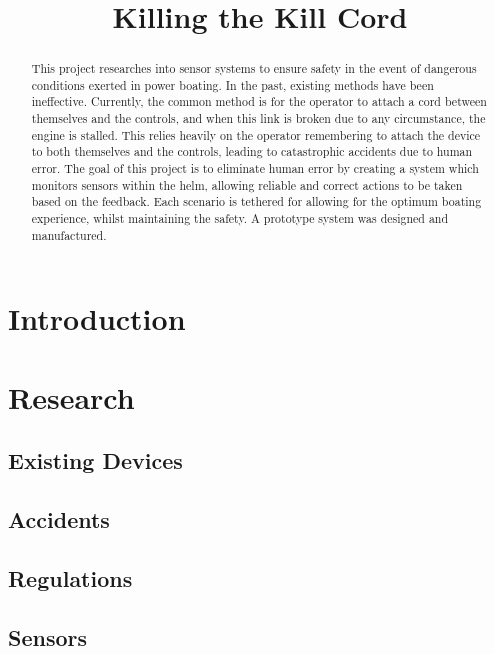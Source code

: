 \documentclass[10pt]{ecsprogressreport}
\begin{document}
\title{Killing the Kill Cord}
\examiner{-}
\maketitle

\begin{abstract}
This project researches into sensor systems to ensure safety in the event of dangerous conditions exerted in power boating. In the past, existing methods have been ineffective. Currently, the common method is for the operator to attach a cord between themselves and the controls, and when this link is broken due to any circumstance, the engine is stalled. This relies heavily on the operator remembering to attach the device to both themselves and the controls, leading to catastrophic accidents due to human error. The goal of this project is to eliminate human error by creating a system which monitors sensors within the helm, allowing reliable and correct actions to be taken based on the feedback. Each scenario is tethered for allowing for the optimum boating experience, whilst maintaining the safety. A prototype system was designed and manufactured.
\end{abstract}

\tableofcontents

\section{Introduction}

\section{Research}

\subsection{Existing Devices}

\subsection{Accidents}

\subsection{Regulations}

\subsection{Sensors}
\end{document}
